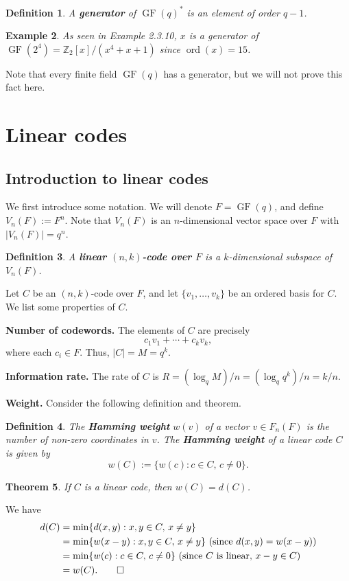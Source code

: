 \documentclass[10pt]{article}
\makeatletter
\newcommand{\Z}{\mathbb{Z}}
\DeclareMathOperator{\ord}{ord}
\DeclareMathOperator{\GF}{GF}
\theoremstyle{newstyle}
\newtheorem{thm}{Theorem}[subsection]
\newtheorem{defn}[thm]{Definition}
\newtheorem{exmp}[thm]{Example}
\newenvironment{pf}[1][\proofname]{\par
  \pushQED{\qed}%
  \normalfont \topsep0\p@\relax
  \trivlist
  \item[\hskip\labelsep\scshape
  #1\@addpunct{.}]\ignorespaces
}{%
  \popQED\endtrivlist\@endpefalse
}
\makeatother
\begin{document}
\begin{defn}
A {\bf generator} of $\GF(q)^*$ is an element of order $q-1$.
\end{defn}

\begin{exmp}
As seen in Example 2.3.10, $x$ is a generator of $\GF(2^4) = \Z_2[x]/(x^4 + x + 1)$ since 
$\ord(x) = 15$.
\end{exmp}

Note that every finite field $\GF(q)$ has a generator, but we will not prove this fact here.

\newpage 
\section{Linear codes} 

\subsection{Introduction to linear codes}

We first introduce some notation. We will denote $F = \GF(q)$, and define 
$V_n(F) := F^n$. Note that $V_n(F)$ is an $n$-dimensional vector space over $F$ with 
$|V_n(F)| = q^n$. 

\begin{defn}
A {\bf linear $(n, k)$-code over $F$} is a $k$-dimensional subspace of $V_n(F)$.
\end{defn}

Let $C$ be an $(n, k)$-code over $F$, and let $\{v_1, \dots, v_k\}$ be an ordered basis for $C$. 
We list some properties of $C$. 

{\bf Number of codewords.} The elements of $C$ are precisely 
\[ c_1 v_1 + \cdots + c_k v_k, \]
where each $c_i \in F$. Thus, $|C| = M = q^k$. 

{\bf Information rate.} The rate of $C$ is $R = (\log_q M)/n = (\log_q q^k)/n = k/n$. 

{\bf Weight.} Consider the following definition and theorem. 

\begin{defn}
The {\bf Hamming weight} $w(v)$ of a vector $v \in F_n(F)$ is the number of non-zero coordinates in $v$.
The {\bf Hamming weight} of a linear code $C$ is given by 
\[ w(C) := \{w(c) : c \in C,\, c \neq 0\}. \]
\end{defn}

\begin{thm}
If $C$ is a linear code, then $w(C) = d(C)$.
\end{thm}
\begin{pf}
We have 
\begin{align*}
d(C) &= \min\{d(x, y) : x, y \in C,\, x \neq y\} \\
&= \min\{w(x - y) : x, y \in C,\, x \neq y\} \text{ (since $d(x, y) = w(x-y)$)} \\
&= \min\{w(c) : c \in C,\, c \neq 0\} \text{ (since $C$ is linear, $x - y \in C$)} \\
&= w(C). \qedhere 
\end{align*}
\end{pf}
\end{document}
